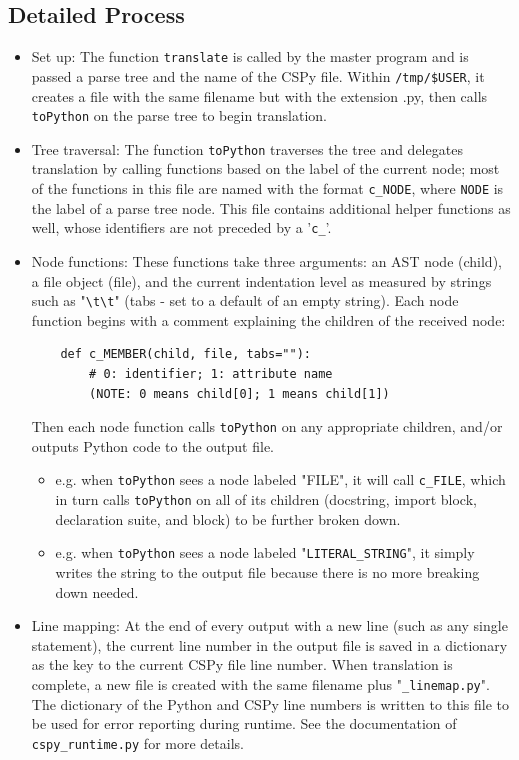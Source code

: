 \documentclass{article}
\begin{document}
\subsection{Detailed Process}
\begin{itemize}
\item Set up: The function \verb|translate| is called by the master program and is passed a parse tree and the name of the CSPy file. Within \verb|/tmp/$USER|, it creates a file with the same filename but with the extension .py, then calls \verb|toPython| on the parse tree to begin translation.
\item Tree traversal: The function \verb|toPython| traverses the tree and delegates translation by calling functions based on the label of the current node; most of the functions in this file are named with the format \verb|c_NODE|, where \verb|NODE| is the label of a parse tree node. This file contains additional helper functions as well, whose identifiers are not preceded by a '\verb|c_|'.
\item Node functions: These functions take three arguments: an AST node (child), a file object (file), and the current indentation level as measured by strings such as "\verb|\t\t|" (tabs - set to a default of an empty string). Each node function begins with a comment explaining the children of the received node:
\begin{verbatim}
    def c_MEMBER(child, file, tabs=""):
        # 0: identifier; 1: attribute name
        (NOTE: 0 means child[0]; 1 means child[1])
\end{verbatim}
Then each node function calls \verb|toPython| on any appropriate children, and/or outputs Python code to the output file.
\begin{itemize}
\item e.g. when \verb|toPython| sees a node labeled "FILE", it will call \verb|c_FILE|, which in turn calls \verb|toPython| on all of its children (docstring, import block, declaration suite, and block) to be further broken down.
\item e.g. when \verb|toPython| sees a node labeled "\verb|LITERAL_STRING|", it simply writes the string to the output file because there is no more breaking down needed.
\end{itemize}
\item Line mapping: At the end of every output with a new line (such as any single statement), the current line number in the output file is saved in a dictionary as the key to the current CSPy file line number. When translation is complete, a new file is created with the same filename plus "\verb|_linemap.py|". The dictionary of the Python and CSPy line numbers is written to this file to be used for error reporting during runtime. See the documentation of \verb|cspy_runtime.py| for more details.

\end{itemize}
\end{document}
